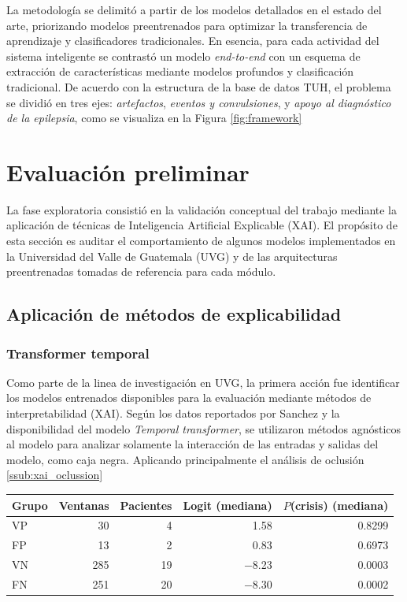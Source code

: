 La metodología se delimitó a partir de los modelos detallados en el estado del arte, priorizando modelos preentrenados para optimizar la transferencia de aprendizaje y clasificadores tradicionales. En esencia, para cada actividad del sistema inteligente se contrastó un modelo \textit{end-to-end} con un esquema de extracción de características mediante modelos profundos y clasificación tradicional. De acuerdo con la estructura de la base de datos TUH, el problema se dividió en tres ejes: \textit{artefactos}, \textit{eventos y convulsiones}, y \textit{apoyo al diagnóstico de la epilepsia}, como se visualiza en la Figura \ref{fig:framework}

\section{Evaluación preliminar}
La fase exploratoria consistió en la validación conceptual del trabajo mediante la aplicación de técnicas de Inteligencia Artificial Explicable (XAI). El propósito de esta sección es auditar el comportamiento de algunos modelos implementados en la Universidad del Valle de Guatemala (UVG) y de las arquitecturas preentrenadas tomadas de referencia para cada módulo. 

\subsection{Aplicación de métodos de explicabilidad}
\subsubsection{Transformer temporal}
Como parte de la linea de investigación en UVG, la primera acción fue identificar los modelos entrenados disponibles para la evaluación mediante métodos de interpretabilidad (XAI). 
Según los datos reportados por Sanchez \cite{Sanchez_2025} y la disponibilidad del modelo \textit{Temporal transformer}, se utilizaron métodos agnósticos al modelo para analizar solamente la interacción de las entradas y salidas del modelo, como caja negra.
Aplicando principalmente el análisis de oclusión \autoref{ssub:xai_oclussion}

\begin{table}[htbp]
\centering
\small
\label{tab:muestra}
\begin{tabular}{lrrrr}
\toprule
Grupo & Ventanas & Pacientes & Logit (mediana) & $P$(crisis) (mediana) \\
\midrule
VP & 30 & 4 & 1.58 & 0.8299 \\
FP & 13 & 2 & 0.83 & 0.6973 \\
VN & 285 & 19 & $-$8.23 & 0.0003 \\
FN & 251 & 20 & $-$8.30 & 0.0002 \\
\bottomrule
\end{tabular}
\end{table}


